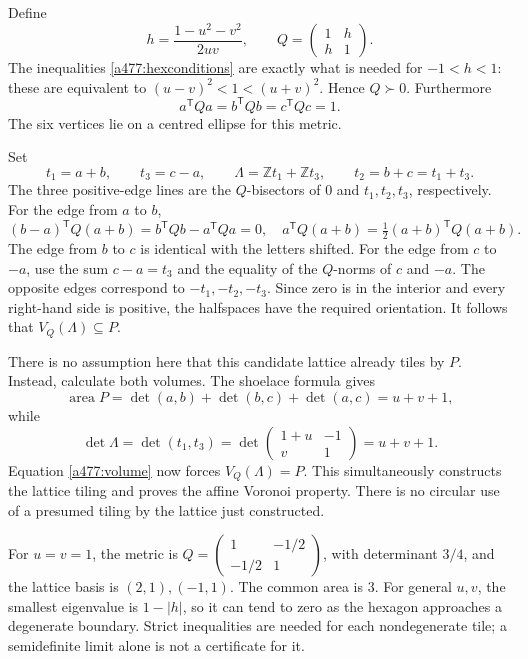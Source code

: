 \documentclass[11pt]{article}
\begin{document}
Define
\begin{equation}\label{a477:hexmetric}
 h=\frac{1-u^2-v^2}{2uv},\qquad
 Q=\begin{pmatrix}1&h\\h&1\end{pmatrix}.
\end{equation}
The inequalities \eqref{a477:hexconditions} are exactly what is needed
for $-1<h<1$: these are equivalent to
$(u-v)^2<1<(u+v)^2$. Hence $Q\succ0$. Furthermore
\[
                    a^{\mathsf T}Qa=b^{\mathsf T}Qb
                                           =c^{\mathsf T}Qc=1.
\]
The six vertices lie on a centred ellipse for this metric.

Set
\[
        t_1=a+b,\qquad t_3=c-a,\qquad
        \Lambda=\mathbb Zt_1+\mathbb Zt_3,\qquad t_2=b+c=t_1+t_3.
\]
The three positive-edge lines are the $Q$-bisectors of $0$ and
$t_1,t_2,t_3$, respectively. For the edge from $a$ to $b$,
\[
 (b-a)^{\mathsf T}Q(a+b)=b^{\mathsf T}Qb-a^{\mathsf T}Qa=0,
 \quad
 a^{\mathsf T}Q(a+b)=\tfrac12(a+b)^{\mathsf T}Q(a+b).
\]
The edge from $b$ to $c$ is identical with the letters shifted. For
the edge from $c$ to $-a$, use the sum $c-a=t_3$ and the equality
of the $Q$-norms of $c$ and $-a$. The opposite edges correspond to
$-t_1,-t_2,-t_3$. Since zero is in the interior and every right-hand
side is positive, the halfspaces have the required orientation.
It follows that $V_Q(\Lambda)\subseteq P$.

There is no assumption here that this candidate lattice already tiles
by $P$. Instead, calculate both volumes. The shoelace formula gives
\[
 \operatorname{area}P
    =\det(a,b)+\det(b,c)+\det(a,c)=u+v+1,
\]
while
\[
 \det\Lambda=\det(t_1,t_3)
     =\det\begin{pmatrix}1+u&-1\\v&1\end{pmatrix}=u+v+1.
\]
Equation \eqref{a477:volume} now forces $V_Q(\Lambda)=P$.
This simultaneously constructs the lattice tiling and proves the
affine Voronoi property. There is no circular use of a presumed tiling
by the lattice just constructed.

For $u=v=1$, the metric is
$Q=\left(\begin{smallmatrix}1&-1/2\\-1/2&1\end{smallmatrix}\right)$,
with determinant $3/4$, and the lattice basis is $(2,1),(-1,1)$.
The common area is $3$. For general $u,v$, the smallest eigenvalue is
$1-|h|$, so it can tend to zero as the hexagon approaches a degenerate
boundary. Strict inequalities are needed for each nondegenerate tile;
a semidefinite limit alone is not a certificate for it.
\end{document}
